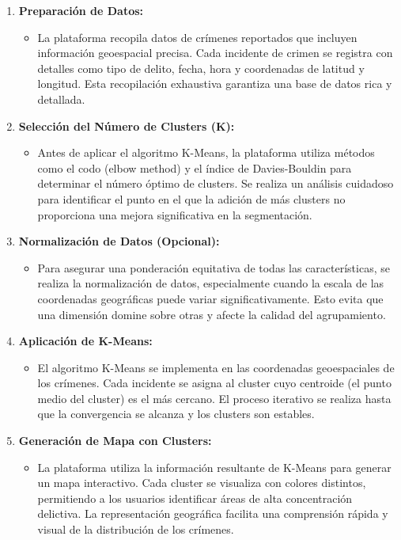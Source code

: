 \documentclass{article}
\begin{document}
    \begin{enumerate}[label= \textbf{\arabic*.}, font=\bfseries]

    \item \textbf{Preparación de Datos:}
       \begin{itemize}
           \item La plataforma recopila datos de crímenes reportados que incluyen información geoespacial precisa. Cada incidente de crimen se registra con detalles como tipo de delito, fecha, hora y coordenadas de latitud y longitud. Esta recopilación exhaustiva garantiza una base de datos rica y detallada.
       \end{itemize}

    \item \textbf{Selección del Número de Clusters (K):}
       \begin{itemize}
           \item Antes de aplicar el algoritmo K-Means, la plataforma utiliza métodos como el codo (elbow method) y el índice de Davies-Bouldin para determinar el número óptimo de clusters. Se realiza un análisis cuidadoso para identificar el punto en el que la adición de más clusters no proporciona una mejora significativa en la segmentación.
       \end{itemize}

    \item \textbf{Normalización de Datos (Opcional):}
       \begin{itemize}
           \item Para asegurar una ponderación equitativa de todas las características, se realiza la normalización de datos, especialmente cuando la escala de las coordenadas geográficas puede variar significativamente. Esto evita que una dimensión domine sobre otras y afecte la calidad del agrupamiento.
       \end{itemize}

    \item \textbf{Aplicación de K-Means:}
       \begin{itemize}
           \item El algoritmo K-Means se implementa en las coordenadas geoespaciales de los crímenes. Cada incidente se asigna al cluster cuyo centroide (el punto medio del cluster) es el más cercano. El proceso iterativo se realiza hasta que la convergencia se alcanza y los clusters son estables.
       \end{itemize}

    \item \textbf{Generación de Mapa con Clusters:}
       \begin{itemize}
           \item La plataforma utiliza la información resultante de K-Means para generar un mapa interactivo. Cada cluster se visualiza con colores distintos, permitiendo a los usuarios identificar áreas de alta concentración delictiva. La representación geográfica facilita una comprensión rápida y visual de la distribución de los crímenes.
       \end{itemize}


\end{enumerate}
\end{document}
